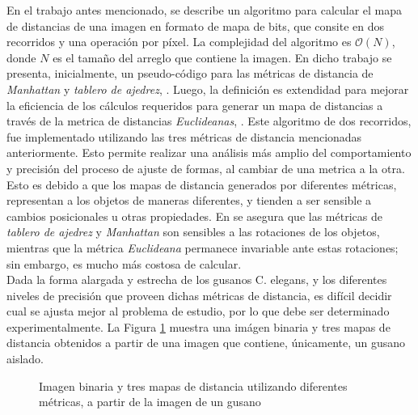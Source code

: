 En el trabajo antes mencionado, se describe un algoritmo para calcular el mapa 
de distancias de una imagen en formato de mapa de bits, que consite en dos recorridos y
una operaci\'on por p\'ixel. La complejidad del algoritmo es $\mathcal{O}(N)$, donde $N$ 
es el tama\~no del arreglo que contiene la imagen.
En dicho trabajo se presenta, inicialmente, un pseudo-c\'odigo para las m\'etricas 
de distancia de \emph{Manhattan} y \emph{tablero de ajedrez}, \cite[p.197]{fastdt}.
Luego, la definici\'on es extendidad para mejorar la eficiencia de los c\'alculos 
requeridos para generar un mapa de distancias a trav\'es de la metrica de distancias
\emph{Euclideanas}, \cite[p.198]{fastdt}.
Este algoritmo de dos recorridos, fue implementado utilizando las tres m\'etricas de
distancia mencionadas anteriormente. Esto permite realizar una an\'alisis m\'as amplio
del comportamiento y precisi\'on del proceso de ajuste de formas, al cambiar de
una metrica a la otra. Esto es debido a que los mapas de distancia generados por 
diferentes m\'etricas, representan a los objetos de maneras diferentes, y tienden
a ser sensible a cambios posicionales u otras propiedades. En \cite[p.332]{eucskeleton}
se asegura que las m\'etricas de \emph{tablero de ajedrez} y \emph{Manhattan} son
sensibles a las rotaciones de los objetos, mientras que la m\'etrica \emph{Euclideana}
permanece invariable ante estas rotaciones; sin embargo, es mucho m\'as costosa de calcular.\\

Dada la forma alargada y estrecha de los gusanos C. elegans, y los diferentes niveles
de precisi\'on que proveen dichas m\'etricas de distancia, es dif\'icil decidir
cual se ajusta mejor al problema de estudio, por lo que debe ser determinado
experimentalmente. La Figura \ref{fig:distance} muestra una im\'agen binaria y tres
mapas de distancia obtenidos a partir de una imagen que contiene, \'unicamente, un
gusano aislado.

\begin{figure}[h t b p ! H]
  \centering
\qquad
\qquad                
\qquad
  \caption{ Imagen binaria y tres mapas de distancia utilizando diferentes m\'etricas,
    a partir de la imagen de un gusano}
  \label{fig:distance}
\end{figure}

